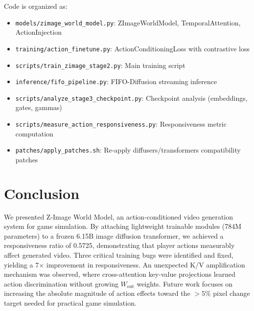 \documentclass[10pt,twocolumn]{article}
\begin{document}
Code is organized as:
\begin{itemize}
  \item \texttt{models/zimage\_world\_model.py}: ZImageWorldModel, TemporalAttention, ActionInjection
  \item \texttt{training/action\_finetune.py}: ActionConditioningLoss with contrastive loss
  \item \texttt{scripts/train\_zimage\_stage2.py}: Main training script
  \item \texttt{inference/fifo\_pipeline.py}: FIFO-Diffusion streaming inference
  \item \texttt{scripts/analyze\_stage3\_checkpoint.py}: Checkpoint analysis (embeddings, gates, gammas)
  \item \texttt{scripts/measure\_action\_responsiveness.py}: Responsiveness metric computation
  \item \texttt{patches/apply\_patches.sh}: Re-apply diffusers/transformers compatibility patches
\end{itemize}

\section{Conclusion}

We presented Z-Image World Model, an action-conditioned video generation system for game simulation. By attaching lightweight trainable modules (784M parameters) to a frozen 6.15B image diffusion transformer, we achieved a responsiveness ratio of 0.5725, demonstrating that player actions measurably affect generated video. Three critical training bugs were identified and fixed, yielding a 7$\times$ improvement in responsiveness. An unexpected K/V amplification mechanism was observed, where cross-attention key-value projections learned action discrimination without growing $W_\text{out}$ weights. Future work focuses on increasing the absolute magnitude of action effects toward the $>5\%$ pixel change target needed for practical game simulation.



\end{document}
